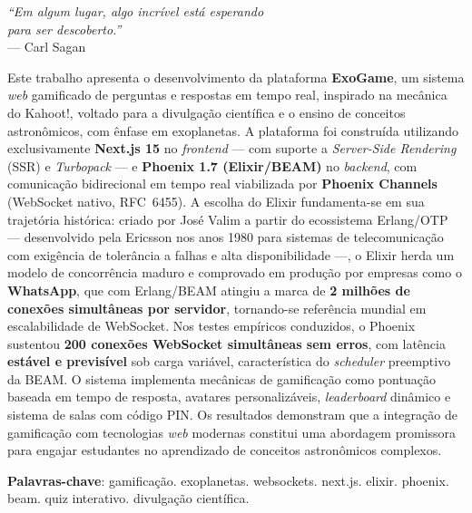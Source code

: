 \documentclass[
	12pt,
	openany,
	oneside,
	a4paper,
	english,
	brazil
]{abntex2}
\begin{document}
\begin{epigrafe}
    \vspace*{\fill}
	\begin{flushright}
		\textit{``Em algum lugar, algo incrível está esperando\\
		para ser descoberto.''}\\
		--- Carl Sagan
	\end{flushright}
\end{epigrafe}

\setlength{\absparsep}{18pt}
\begin{resumo}
Este trabalho apresenta o desenvolvimento da plataforma \textbf{ExoGame}, um sistema \textit{web} gamificado de perguntas e respostas em tempo real, inspirado na mecânica do Kahoot!, voltado para a divulgação científica e o ensino de conceitos astronômicos, com ênfase em exoplanetas. A plataforma foi construída utilizando exclusivamente \textbf{Next.js 15} no \textit{frontend} --- com suporte a \textit{Server-Side Rendering} (SSR) e \textit{Turbopack} --- e \textbf{Phoenix 1.7 (Elixir/BEAM)} no \textit{backend}, com comunicação bidirecional em tempo real viabilizada por \textbf{Phoenix Channels} (WebSocket nativo, RFC~6455). A escolha do Elixir fundamenta-se em sua trajetória histórica: criado por José Valim a partir do ecossistema Erlang/OTP --- desenvolvido pela Ericsson nos anos 1980 para sistemas de telecomunicação com exigência de tolerância a falhas e alta disponibilidade ---, o Elixir herda um modelo de concorrência maduro e comprovado em produção por empresas como o \textbf{WhatsApp}, que com Erlang/BEAM atingiu a marca de \textbf{2 milhões de conexões simultâneas por servidor}, tornando-se referência mundial em escalabilidade de WebSocket. Nos testes empíricos conduzidos, o Phoenix sustentou \textbf{200 conexões WebSocket simultâneas sem erros}, com latência \textbf{estável e previsível} sob carga variável, característica do \textit{scheduler} preemptivo da BEAM. O sistema implementa mecânicas de gamificação como pontuação baseada em tempo de resposta, avatares personalizáveis, \textit{leaderboard} dinâmico e sistema de salas com código PIN. Os resultados demonstram que a integração de gamificação com tecnologias \textit{web} modernas constitui uma abordagem promissora para engajar estudantes no aprendizado de conceitos astronômicos complexos.

\textbf{Palavras-chave}: gamificação. exoplanetas. websockets. next.js. elixir. phoenix. beam. quiz interativo. divulgação científica.
\end{resumo}
\end{document}

